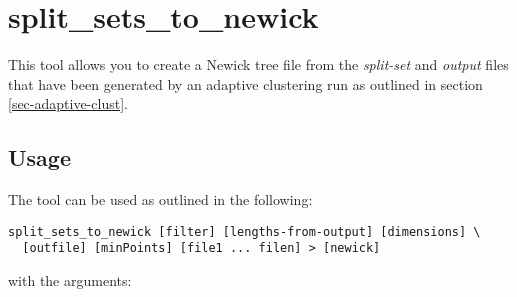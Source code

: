 \section{split\_sets\_to\_newick} \label{sec-ssnewick}

This tool allows you to create a Newick \cite{newick} tree file from the
\emph{split-set} and \emph{output} files that have been generated by
an adaptive clustering run as outlined in section
\ref{sec-adaptive-clust}.

\subsection{Usage}

The tool can be used as outlined in the following:

\begin{lstlisting}
split_sets_to_newick [filter] [lengths-from-output] [dimensions] \
  [outfile] [minPoints] [file1 ... filen] > [newick]
\end{lstlisting}
with the arguments:

